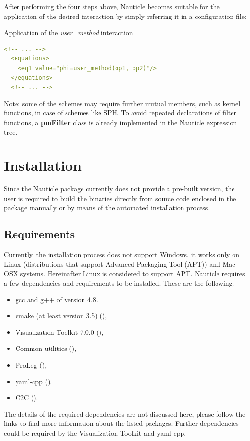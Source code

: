 \documentclass[a4paper,12pt,openany]{book}
\newcommand{\myhref}[3][nauticlegreen_dark]{\href{#2}{\color{#1}{#3}}}%
\theoremstyle{break}
\begin{document}
After performing the four steps above, Nauticle becomes suitable for the application of the desired interaction by simply referring it in a configuration file:
\begin{example}{Application of the \textit{user\_method} interaction}{}
\lstset{basicstyle=\tiny}
\begin{lstlisting}[language=YAML]
  <!-- ... -->
  <equations>
    <eq1 value="phi=user_method(op1, op2)"/>
  </equations>
  <!-- ... -->
\end{lstlisting}
\end{example}

Note: some of the schemes may require further mutual members, such as kernel functions, in case of schemes like SPH. To avoid repeated declarations of filter functions, a \textbf{pmFilter} class is already implemented in the Nauticle expression tree.


\section{Installation}
Since the Nauticle package currently does not provide a pre-built version, the user is required to build the binaries directly from source code enclosed in the package manually or by means of the automated installation process.
\subsection{Requirements}
Currently, the installation process does not support Windows, it works only on Linux (distributions that support Advanced Packaging Tool (APT)) and Mac OSX systems. Hereinafter Linux is considered to support APT.
Nauticle requires a few dependencies and requirements to be installed. These are the following:
\begin{itemize}
  \item gcc and g++ of version 4.8.
  \item cmake (at least version 3.5) (\myhref{https://cmake.org/download/}{https://cmake.org/download/}),
  \item Visualization Toolkit 7.0.0 (\myhref{http://www.vtk.org/files/release/7.0/VTK-7.0.0.zip}{http://www.vtk.org/files/release/7.0/VTK-7.0.0.zip}),
  \item Common utilities (\myhref{https://bitbucket.org/BalazsToth/commonutils}{https://bitbucket.org/BalazsToth/commonutils}),
  \item ProLog (\myhref{https://bitbucket.org/BalazsToth/prolog}{https://bitbucket.org/BalazsToth/prolog}),
  \item yaml-cpp (\myhref{https://github.com/jbeder/yaml-cpp}{https://github.com/jbeder/yaml-cpp}).
  \item C2C (\myhref{https://bitbucket.org/nauticleproject/c2c}{https://bitbucket.org/nauticleproject/c2c}).
\end{itemize}
The details of the required dependencies are not discussed here, please follow the links to find more information about the listed packages. Further dependencies could be required by the Visualization Toolkit and yaml-cpp.
\end{document}
